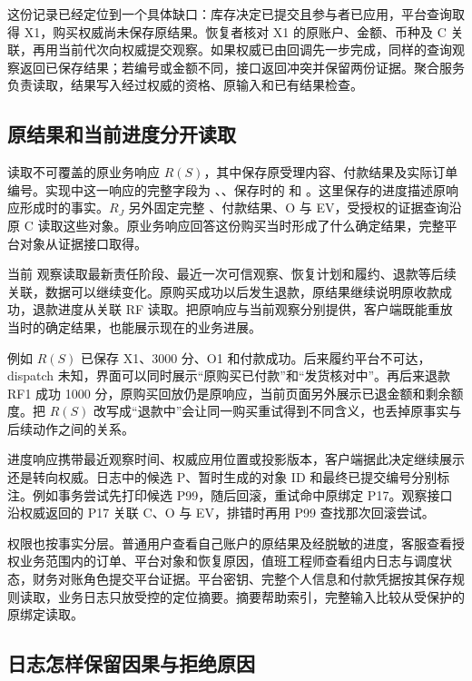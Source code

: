 这份记录已经定位到一个具体缺口：库存决定已提交且参与者已应用，平台查询取得 X1，购买权威尚未保存原结果。恢复者核对 X1 的原账户、金额、币种及 C 关联，再用当前代次向权威提交观察。如果权威已由回调先一步完成，同样的查询观察返回已保存结果；若编号或金额不同，接口返回冲突并保留两份证据。聚合服务负责读取，结果写入经过权威的资格、原输入和已有结果检查。

\subsection{原结果和当前进度分开读取}

 读取不可覆盖的原业务响应 $R(S)$，其中保存原受理内容、付款结果及实际订单编号。实现中这一响应的完整字段为 、、保存时的  和 \mbox{}。这里保存的进度描述原响应形成时的事实。$R_J$ 另外固定完整 、付款结果、O 与 EV，受授权的证据查询沿原 C 读取这些对象。原业务响应回答这份购买当时形成了什么确定结果，完整平台对象从证据接口取得。

当前  观察读取最新责任阶段、最近一次可信观察、恢复计划和履约、退款等后续关联，数据可以继续变化。原购买成功以后发生退款，原结果继续说明原收款成功，退款进度从关联 RF 读取。把原响应与当前观察分别提供，客户端既能重放当时的确定结果，也能展示现在的业务进展。

例如 $R(S)$ 已保存 X1、3000 分、O1 和付款成功。后来履约平台不可达，dispatch 未知，界面可以同时展示“原购买已付款”和“发货核对中”。再后来退款 RF1 成功 1000 分，原购买回放仍是原响应，当前页面另外展示已退金额和剩余额度。把 $R(S)$ 改写成“退款中”会让同一购买重试得到不同含义，也丢掉原事实与后续动作之间的关系。

进度响应携带最近观察时间、权威应用位置或投影版本，客户端据此决定继续展示还是转向权威。日志中的候选 P、暂时生成的对象 ID 和最终已提交编号分别标注。例如事务尝试先打印候选 P99，随后回滚，重试命中原绑定 P17。观察接口沿权威返回的 P17 关联 C、O 与 EV，排错时再用 P99 查找那次回滚尝试。

权限也按事实分层。普通用户查看自己账户的原结果及经脱敏的进度，客服查看授权业务范围内的订单、平台对象和恢复原因，值班工程师查看组内日志与调度状态，财务对账角色提交平台证据。平台密钥、完整个人信息和付款凭据按其保存规则读取，业务日志只放受控的定位摘要。摘要帮助索引，完整输入比较从受保护的原绑定读取。

\subsection{日志怎样保留因果与拒绝原因}

